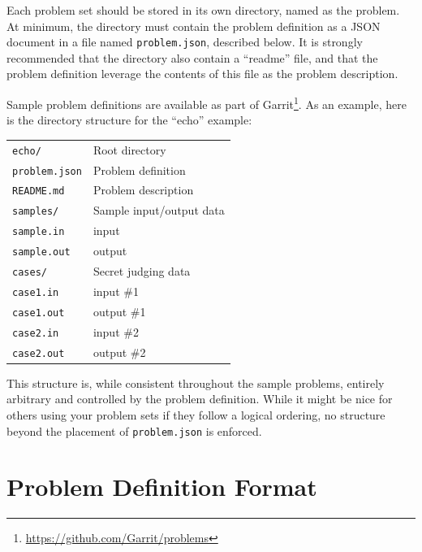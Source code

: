 \documentclass[11pt,letterpaper]{article}
\begin{document}
Each problem set should be stored in its own directory, named as the problem.
At minimum, the directory must contain the problem definition as a JSON
document in a file named \texttt{problem.json}, described below. It is strongly
recommended that the directory also contain a ``readme'' file, and that the
problem definition leverage the contents of this file as the problem
description.

Sample problem definitions are available as part of
Garrit\footnote{\url{https://github.com/Garrit/problems}}. As an example, here
is the directory structure for the ``echo'' example:

\begin{tabular}{ l l }
    \texttt{echo/} & Root directory \\
    \texttt{\hphantom{echo/}problem.json} & Problem definition \\
    \texttt{\hphantom{echo/}README.md} & Problem description \\
    \texttt{\hphantom{echo/}samples/} & Sample input/output data \\
    \texttt{\hphantom{echo/samples/}sample.in} & \hphantom{Sample} input \\
    \texttt{\hphantom{echo/samples/}sample.out} & \hphantom{Sample} output \\
    \texttt{\hphantom{echo/}cases/} & Secret judging data \\
    \texttt{\hphantom{echo/cases/}case1.in} & \hphantom{Secret} input \#1 \\
    \texttt{\hphantom{echo/cases/}case1.out} & \hphantom{Secret} output \#1 \\
    \texttt{\hphantom{echo/cases/}case2.in} & \hphantom{Secret} input \#2 \\
    \texttt{\hphantom{echo/cases/}case2.out} & \hphantom{Secret} output \#2 \\
\end{tabular}

This structure is, while consistent throughout the sample problems, entirely
arbitrary and controlled by the problem definition. While it might be nice for
others using your problem sets if they follow a logical ordering, no structure
beyond the placement of \texttt{problem.json} is enforced.

\section{Problem Definition Format}
\label{format}
\end{document}
